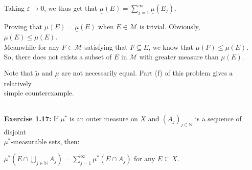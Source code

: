 \documentclass{book}
\newenvironment{myIndent}{%
   \begin{adjustwidth}{2.5em}{0em}%
}{%
   \end{adjustwidth}%
}
\newcommand{\blab}[1]{\textbf{#1}}
\newcommand{\mySepTwo}[1][.]{%
   {\noindent\color{#1}{\rule{6.5in}{0.5mm}}}\\%
}
\newcommand{\retTwo}{\hfill\bigbreak}
\begin{document}
\begin{enumerate}
\begin{myIndent}
      Taking $\varepsilon \rightarrow 0$, we thus get that $\underline{\mu}(E) = \sum\limits_{j=1}^\infty \underline{\mu}(E_j)$.\retTwo

      Proving that $\mu(E) = \underline{\mu}(E)$ when $E \in \mathcal{M}$ is trivial. Obviously, $\mu(E) \leq \underline{\mu}(E)$.\\ [2pt] Meanwhile for any $F \in \mathcal{M}$ satisfying that $F \subseteq E$, we know that $\mu(F) \leq \mu(E)$.\\ [2pt] So, there does not exists a subset of $E$ in $\mathcal{M}$ with greater measure than $\mu(E)$.\retTwo
   \end{myIndent}

   Note that $\widetilde{\mu}$ and $\underline{\mu}$ are not necessarily equal. Part (f) of this problem gives a relatively\\ [2pt] simple counterexample.

\end{enumerate}

\mySepTwo

\blab{Exercise 1.17:} If $\mu^*$ is an outer measure on $X$ and $(A_j)_{j\in \mathbb{N}}$ is a sequence of disjoint\\ $\mu^*$-measurable sets, then:

{\centering $\mu^*(E \cap \bigcup\limits_{j \in \mathbb{N}}A_j) = \sum\limits_{j=1}^\infty \mu^*(E \cap A_j)$ for any $E \subseteq X$.\retTwo\par}
\end{document}
